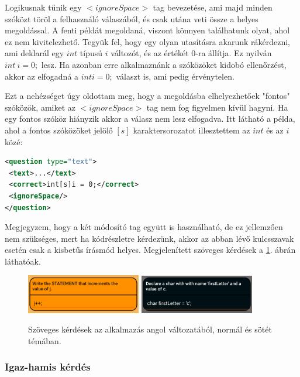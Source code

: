 \documentclass[12pt,a4paper]{article}
\begin{document}
	Logikusnak tűnik egy $<ignoreSpace>$ tag bevezetése, ami majd minden szóközt töröl a felhasználó válaszából, és csak utána veti össze a helyes megoldással. A fenti példát megoldaná, viszont könnyen találhatunk olyat, ahol ez nem kivitelezhető. Tegyük fel, hogy egy olyan utasításra akarunk rákérdezni, ami deklarál egy $int$ típusú $i$ változót, és az értékét $0$-ra állítja. Ez nyilván $int \ i = 0;$ lesz. Ha azonban erre alkalmaznánk a szóközöket kidobó ellenőrzést, akkor az elfogadná a $inti=0;$ választ is, ami pedig érvénytelen.
	
	Ezt a nehézséget úgy oldottam meg, hogy a megoldásba elhelyezhetőek "fontos" szóközök, amiket az $<ignoreSpace>$ tag nem fog figyelmen kívül hagyni. Ha egy fontos szóköz hiányzik akkor a válasz nem lesz elfogadva. Itt látható a példa, ahol a fontos szóközöket jelölő $[s]$ karaktersorozatot illesztettem az $int$ és az $i$ közé:
	
	\begin{lstlisting}[language=XML]	
<question type="text">
 <text>...</text>
 <correct>int[s]i = 0;</correct>
 <ignoreSpace/>
</question>
	\end{lstlisting}
	
	\noindent
	Megjegyzem, hogy a két módosító tag együtt is használható, de ez jellemzően nem szükséges, mert ha kódrészletre kérdezünk, akkor az abban lévő kulcsszavak esetén csak a kisbetűs írásmód helyes. Megjelenített szöveges kérdések a \ref{question_text_figure}. ábrán láthatóak.
	
	\begin{figure}[h!]
		\centering
		\includegraphics[width=5cm]{question_text}
		\includegraphics[width=5cm]{question_text_dark}
		\caption{Szöveges kérdések az alkalmazás angol változatából, normál és sötét témában.}
		\label{question_text_figure}
	\end{figure}

	\subsubsection{Igaz-hamis kérdés}
	
\end{document}
